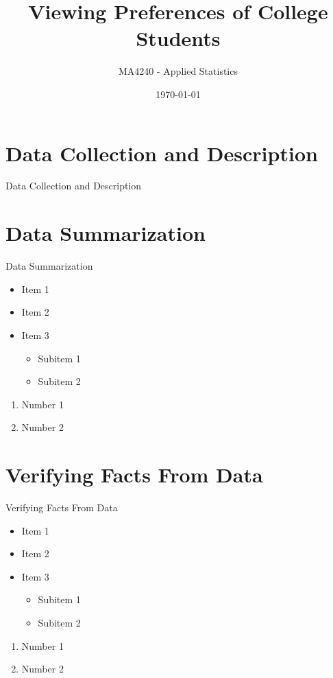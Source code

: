 \documentclass{beamer}
\title{Viewing Preferences of College Students }
\subtitle{MA4240 - Applied Statistics}
\author{\textbf{Contributors :\texorpdfstring{\\[0.5em]}{}}{\small Donal Loitam \and Himanshu Kumar Gupta \and Gunjit Mittal \texorpdfstring{\\}{}  Suraj Kumar \and Ravula Karthik \and Abhishek Kumar \texorpdfstring{\\}{}  Mannem Charan \and Iragavarapu Sai Pradeep \and Shivanshu}}
\date{\today}
\begin{document}
\begin{frame}
  \titlepage
\end{frame}
\section{Data Collection and Description}
\begin{frame}{Data Collection and Description}
    \blindtext
\end{frame}
\section{Data Summarization}
\begin{frame}{Data Summarization}
    \begin{itemize}
        \item Item 1
        \item Item 2
        \item Item 3
        \begin{itemize}
            \item Subitem 1
            \item Subitem 2
        \end{itemize}
    \end{itemize}

    \begin{enumerate}
        \item Number 1
        \item Number 2
    \end{enumerate}
\end{frame}
\section{Verifying Facts From Data}
\begin{frame}{Verifying Facts From Data}
    \begin{itemize}
        \item Item 1
        \item Item 2
        \item Item 3
        \begin{itemize}
            \item Subitem 1
            \item Subitem 2
        \end{itemize}
    \end{itemize}

    \begin{enumerate}
        \item Number 1
        \item Number 2
    \end{enumerate}
\end{frame}
\end{document}
